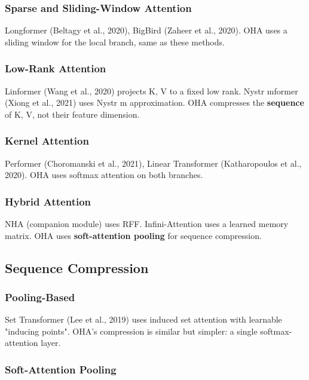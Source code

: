 \subsubsection{Sparse and Sliding-Window Attention}

Longformer (Beltagy et al., 2020), BigBird (Zaheer et al., 2020). OHA 
uses a sliding window for the local branch, same as these methods.

\subsubsection{Low-Rank Attention}

Linformer (Wang et al., 2020) projects K, V to a fixed low rank. 
Nystr mformer (Xiong et al., 2021) uses Nystr m approximation. OHA 
compresses the \textbf{sequence} of K, V, not their feature dimension.

\subsubsection{Kernel Attention}

Performer (Choromanski et al., 2021), Linear Transformer (Katharopoulos 
et al., 2020). OHA uses softmax attention on both branches.

\subsubsection{Hybrid Attention}

NHA (companion module) uses RFF. Infini-Attention uses a learned memory 
matrix. OHA uses \textbf{soft-attention pooling} for sequence compression.

\subsection{Sequence Compression}

\subsubsection{Pooling-Based}

Set Transformer (Lee et al., 2019) uses induced set attention with 
learnable "inducing points". OHA's compression is similar but simpler: 
a single softmax-attention layer.

\subsubsection{Soft-Attention Pooling}

